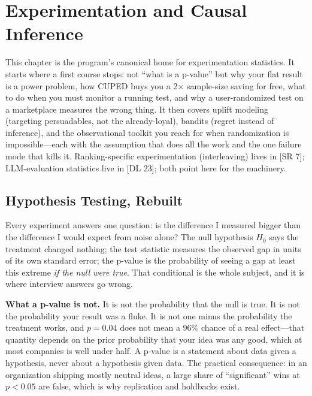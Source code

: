 \chapter{Experimentation and Causal Inference}
\label{cml:chap:experimentation_causal}

\begin{tldr}
This chapter is the program's canonical home for experimentation statistics. It starts where a first course stops: not ``what is a p-value'' but why your flat result is a power problem, how CUPED buys you a 2$\times$ sample-size saving for free, what to do when you must monitor a running test, and why a user-randomized test on a marketplace measures the wrong thing. It then covers uplift modeling (targeting persuadables, not the already-loyal), bandits (regret instead of inference), and the observational toolkit you reach for when randomization is impossible---each with the assumption that does all the work and the one failure mode that kills it. Ranking-specific experimentation (interleaving) lives in [SR 7]; LLM-evaluation statistics live in [DL 23]; both point here for the machinery.
\end{tldr}

\section{Hypothesis Testing, Rebuilt}
\label{cml:sec:testing_rebuilt}

Every experiment answers one question: is the difference I measured bigger than the difference I would expect from noise alone? The null hypothesis $H_0$ says the treatment changed nothing; the test statistic measures the observed gap in units of its own standard error; the p-value is the probability of seeing a gap at least this extreme \emph{if the null were true}. That conditional is the whole subject, and it is where interview answers go wrong.

\begin{keyinsight}
\textbf{What a p-value is not.} It is not the probability that the null is true. It is not the probability your result was a fluke. It is not one minus the probability the treatment works, and $p = 0.04$ does not mean a 96\% chance of a real effect---that quantity depends on the prior probability that your idea was any good, which at most companies is well under half. A p-value is a statement about data given a hypothesis, never about a hypothesis given data. The practical consequence: in an organization shipping mostly neutral ideas, a large share of ``significant'' wins at $p<0.05$ are false, which is why replication and holdbacks exist.
\end{keyinsight}

